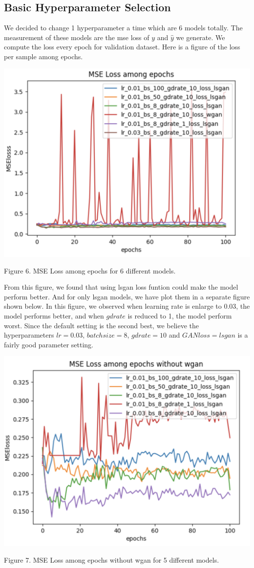 \documentclass[letterpaper]{article}
\begin{document}
\subsection{Basic Hyperparameter Selection}
We decided to change 1 hyperparameter a time which are 6 models totally. The measurement of these models are the mse loss of $y$ and $\hat{y}$ we generate. We compute the loss every epoch for validation dataset. Here is a figure of the loss per sample among epochs.

\begin{center}
    \includegraphics[width=.5\textwidth]{./update-figs/MSE loss among epochs.png}

    Figure 6. MSE Loss among epochs for 6 different models.
\end{center}

From this figure, we found that using lsgan loss funtion could make the model perform better. And for only lsgan models, we have plot them in a separate figure shown below. In this figure, we observed when learning rate is enlarge to 0.03, the model performs better, and when $gdrate$ is reduced to 1, the model perform worst. Since the default setting is the second best, we believe the hyperparameters $lr=0.03$, $batchsize=8$, $gdrate=10$ and $GAN loss=lsgan$ is a fairly good parameter setting.

\begin{center}
    \includegraphics[width=.5\textwidth]{./update-figs/MSE loss among epochs without wgan.png}

    Figure 7. MSE Loss among epochs without wgan for 5 different models.
\end{center}
\end{document}
